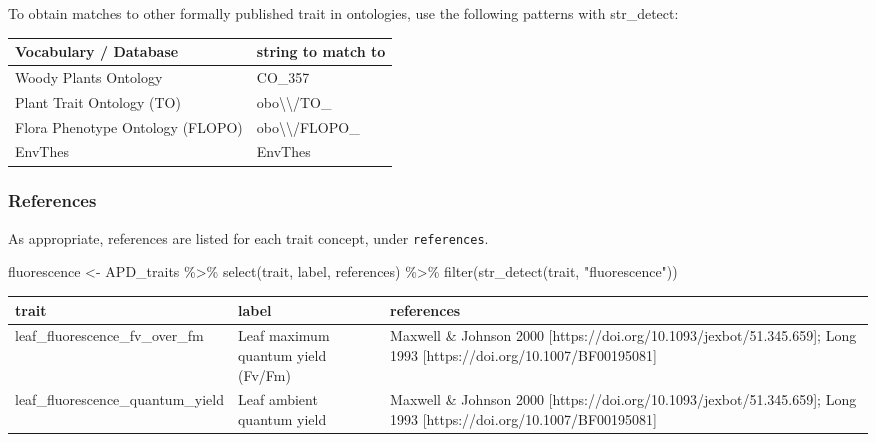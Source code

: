 \documentclass[
  letterpaper,
  DIV=11,
  numbers=noendperiod]{scrartcl}
\newenvironment{Shaded}{\begin{snugshade}}{\end{snugshade}}
\newcommand{\FunctionTok}[1]{\textcolor[rgb]{0.28,0.35,0.67}{#1}}
\newcommand{\NormalTok}[1]{\textcolor[rgb]{0.00,0.23,0.31}{#1}}
\newcommand{\OtherTok}[1]{\textcolor[rgb]{0.00,0.23,0.31}{#1}}
\newcommand{\SpecialCharTok}[1]{\textcolor[rgb]{0.37,0.37,0.37}{#1}}
\newcommand{\StringTok}[1]{\textcolor[rgb]{0.13,0.47,0.30}{#1}}
\begin{document}
To obtain matches to other formally published trait in ontologies, use
the following patterns with str\_detect:

\begin{longtable}[]{@{}ll@{}}
\toprule\noalign{}
Vocabulary / Database & string to match to \\
\midrule\noalign{}
\endhead
\bottomrule\noalign{}
\endlastfoot
Woody Plants Ontology & CO\_357 \\
Plant Trait Ontology (TO) & obo\textbackslash\textbackslash/TO\_ \\
Flora Phenotype Ontology (FLOPO) &
obo\textbackslash\textbackslash/FLOPO\_ \\
EnvThes & EnvThes \\
\end{longtable}

\pagebreak

\hypertarget{references}{%
\subsubsection{References}\label{references}}

As appropriate, references are listed for each trait concept, under
\texttt{references}.

\begin{Shaded}
\begin{Highlighting}[]
\NormalTok{fluorescence }\OtherTok{\textless{}{-}} 
\NormalTok{  APD\_traits }\SpecialCharTok{\%\textgreater{}\%}
  \FunctionTok{select}\NormalTok{(trait, label, references) }\SpecialCharTok{\%\textgreater{}\%}
  \FunctionTok{filter}\NormalTok{(}\FunctionTok{str\_detect}\NormalTok{(trait, }\StringTok{"fluorescence"}\NormalTok{))}
\end{Highlighting}
\end{Shaded}

\begin{tabular}{>{\raggedright\arraybackslash}p{5.8cm}>{\raggedright\arraybackslash}p{3.9cm}>{\raggedright\arraybackslash}p{7cm}}
\toprule
trait & label & references\\
\midrule
leaf\_fluorescence\_fv\_over\_fm & Leaf maximum quantum yield (Fv/Fm) & Maxwell \& Johnson 2000 [https://doi.org/10.1093/jexbot/51.345.659]; Long 1993 [https://doi.org/10.1007/BF00195081]\\
leaf\_fluorescence\_quantum\_yield & Leaf ambient quantum yield & Maxwell \& Johnson 2000 [https://doi.org/10.1093/jexbot/51.345.659]; Long 1993 [https://doi.org/10.1007/BF00195081]\\
\bottomrule
\end{tabular}
\end{document}
